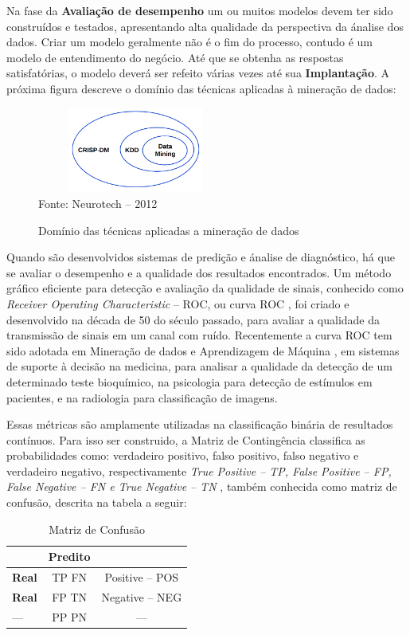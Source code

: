 Na fase da \textbf{Avaliação de desempenho} um ou muitos modelos devem ter sido construídos e testados, apresentando alta qualidade da perspectiva da ánalise dos dados.
Criar um modelo geralmente não é o fim do processo, contudo é um modelo de entendimento do negócio. 
Até que se obtenha as respostas satisfatórias, o modelo deverá ser refeito várias vezes até sua \textbf{Implantação}. 
A próxima figura descreve o domínio das técnicas aplicadas à mineração de dados:

\begin{figure}[!ht]
\centering
\caption{Domínio das técnicas aplicadas a mineração de dados}
\includegraphics[width=65mm, height=28mm]{Figuras/BigData/RelacaoCrispKddDm.png}\\
\tiny Fonte: Neurotech -- 2012
\end{figure}


Quando são desenvolvidos sistemas de predição e ánalise de diagnóstico, há que se avaliar o desempenho e a qualidade dos resultados encontrados.
Um método gráfico eficiente para detecção e avaliação da qualidade de sinais, conhecido como \textit{Receiver Operating Characteristic} -- ROC, ou curva ROC \cite{ROC},
foi criado e desenvolvido na década de 50 do século passado, para avaliar a qualidade da transmissão de sinais em um canal com ruído.
Recentemente a curva ROC tem sido adotada em Mineração de dados e Aprendizagem de Máquina \cite{MD_AM}, em sistemas de suporte à decisão na medicina, para analisar a qualidade da detecção 
de um determinado teste bioquímico, na psicologia para detecção de estímulos \cite{Discriminativo} em pacientes, e na radiologia para classificação de imagens.

Essas métricas são amplamente utilizadas na classificação binária de resultados contínuos. Para isso ser construido, a Matriz de Contingência classifica as probabilidades como:
verdadeiro positivo, falso positivo, falso negativo e verdadeiro negativo, respectivamente \textit{True Positive -- TP, False Positive -- FP, False Negative -- FN e True Negative -- TN },
também conhecida como matriz de confusão, descrita na tabela a seguir:

\begin{table}[ht]
\centering
\caption{Matriz de Confusão}
\vspace{1mm}
\begin{tabular}{l|c|c}
\hline
\textbf{} & \textbf{Predito} & \textbf{}\\
\hline
\textbf{Real}  & TP   FN & Positive -- POS\\
\textbf{Real}  & FP   TN & Negative -- NEG\\
\hline
   ---         & PP   PN &    ---         \\
\end{tabular}
\end{table}


